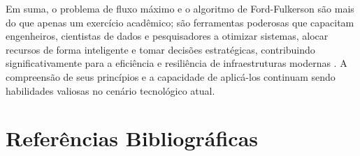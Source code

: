 \documentclass[12pt]{article}
\begin{document}
\noindent Em suma, o problema de fluxo máximo e o algoritmo de Ford-Fulkerson são mais do que apenas um exercício acadêmico; são ferramentas poderosas que capacitam engenheiros, cientistas de dados e pesquisadores a otimizar sistemas, alocar recursos de forma inteligente e tomar decisões estratégicas, contribuindo significativamente para a eficiência e resiliência de infraestruturas modernas \cite{kleinberg2006}. A compreensão de seus princípios e a capacidade de aplicá-los continuam sendo habilidades valiosas no cenário tecnológico atual.




\newpage
\section{Referências Bibliográficas}



\end{document}

